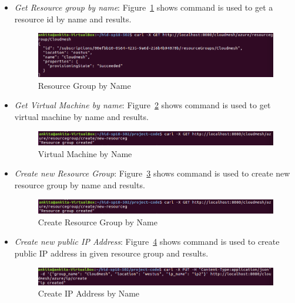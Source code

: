\begin{itemize}
\item \textit{Get Resource group by name}: Figure~\ref{fig:get-resource} shows
command is used to get a resource id by name and results.

\begin{figure}[!ht]
        \centering\includegraphics[width=\columnwidth]
        {image/get-resource.PNG}
        \caption{Resource Group by Name}\label{fig:get-resource}
\end{figure}

\item \textit{Get Virtual Machine by name}: Figure~\ref{fig:get-vm} shows
command is used to get virtual machine by name and results.

\begin{figure}[!ht]
        \centering\includegraphics[width=\columnwidth]
        {image/get-vm.PNG}
        \caption{Virtual Machine by Name}\label{fig:get-vm}
\end{figure}

\item \textit{Create new Resource Group}: Figure~\ref{fig:resource-create}
shows command is used to create new resource group by name and results.

\begin{figure}[!ht]
        \centering\includegraphics[width=\columnwidth]
        {image/resource-create.PNG}
        \caption{Create Resource Group by Name}\label{fig:resource-create}
\end{figure}

\item \textit{Create new public IP Address}: Figure~\ref{fig:ip-create} shows
command is used to create public IP address in given resource group and
results.

\begin{figure}[!ht]
        \centering\includegraphics[width=\columnwidth]
        {image/ip-create.PNG}
        \caption{Create IP Address by Name}\label{fig:ip-create}
\end{figure}


\end{itemize}
